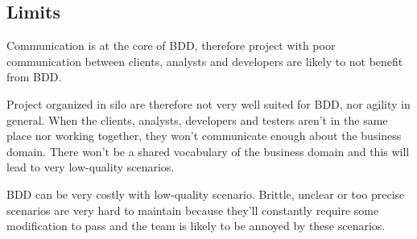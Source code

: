\subsection{Limits}\label{subsec:limits}

Communication is at the core of BDD, therefore project with poor
communication between clients, analysts and developers are likely to not
benefit from BDD\@.

Project organized in silo are therefore not very well suited for BDD, nor
agility in general.
When the clients, analysts, developers and testers aren't in the same place
nor working together, they won't communicate enough about the business domain.
There won't be a shared vocabulary of the business domain and this will lead
to very low-quality scenarios.

BDD can be very costly with low-quality scenario.
Brittle, unclear or too precise scenarios are very hard to maintain because
they'll constantly require some modification to pass and the team is likely
to be annoyed by these scenarios.
